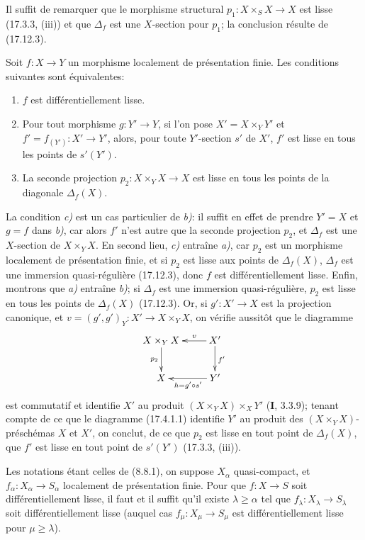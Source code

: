 Il suffit de remarquer que le morphisme structural $p_1:X\times_SX\to X$ est lisse (17.3.3, (iii)) et que $\Delta_f$ est une $X$-section pour $p_1$; la conclusion résulte de (17.12.3).

\begin{proposition}[17.12.5]
\label{IV.17.12.5}
Soit $f:X\to Y$ un morphisme localement de présentation finie. Les conditions suivantes sont équivalentes:
\begin{enumerate}
  \item[\textup{a)}] $f$ est différentiellement lisse.
  \item[\textup{b)}] Pour tout morphisme $g:Y'\to Y$, si l'on pose $X'=X\times_Y Y'$ et $f'=f_{(Y')}:X'\to Y'$, alors, pour toute $Y'$-section $s'$ de $X'$, $f'$ est lisse en tous les points de $s'(Y')$.
  \item[\textup{c)}] La seconde projection $p_2:X\times_YX\to X$ est lisse en tous les points de la diagonale $\Delta_f(X)$.
\end{enumerate}
\end{proposition}


La condition \emph{c)} est un cas particulier de \emph{b)}: il suffit en effet de prendre $Y'=X$ et $g=f$ dans \emph{b)}, car alors $f'$ n'est autre que la seconde projection $p_2$, et $\Delta_f$ est une $X$-section de $X\times_YX$. En second lieu, \emph{c)} entraîne \emph{a)}, car $p_2$ est un morphisme localement de présentation finie, et si $p_2$ est lisse aux points de $\Delta_f(X)$, $\Delta_f$ est une immersion quasi-régulière (17.12.3), donc $f$ est différentiellement lisse. Enfin, montrons que \emph{a)} entraîne \emph{b)}; si $\Delta_f$ est une immersion quasi-régulière, $p_2$ est lisse en tous les points de $\Delta_f(X)$ (17.12.3).
Or, si $g':X'\to X$ est la projection canonique, et $v=(g',g')_Y:X'\to X\times_YX$, on vérifie aussitôt que le diagramme
\[
\xymatrix{
  X\times_Y X \ar[d]_{p_2} & X' \ar[l]_-v \ar[d]^{f'}\\
  X & Y' \ar[l]^{h=g'\circ s'}
}
\]
est commutatif et identifie $X'$ au produit $(X\times_YX)\times_XY'$ (\textbf{I}, 3.3.9); tenant compte de ce que le diagramme (17.4.1.1) identifie $Y'$ au produit des $(X\times_YX)$-préschémas $X$ et $X'$, on conclut, de ce que $p_2$ est lisse en tout point de $\Delta_f(X)$, que $f'$ est lisse en tout point de $s'(Y')$ (17.3.3, (iii)).

\begin{corollary}[17.12.6]
\label{IV.17.12.6}
Les notations étant celles de \textup{(8.8.1)}, on suppose $X_\alpha$ quasi-compact, et $f_\alpha:X_\alpha\to S_\alpha$ localement de présentation finie. Pour que $f:X\to S$ soit différentiellement lisse, il faut et il suffit qu'il existe $\lambda\geq\alpha$ tel que $f_\lambda:X_\lambda\to S_\lambda$ soit différentiellement lisse \textup{(}auquel cas $f_\mu:X_\mu\to S_\mu$ est différentiellement lisse pour $\mu\geq\lambda$\textup{)}.
\end{corollary}

